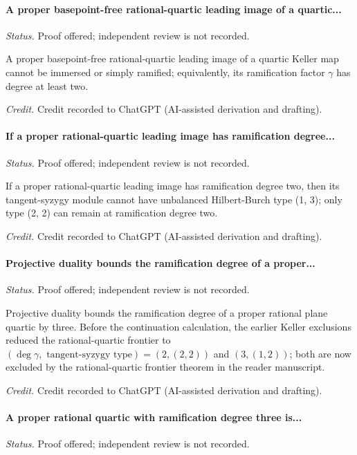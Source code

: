 \label{supp-note-02-023}
\paragraph{A proper basepoint-free rational-quartic leading image of a quartic...}
\emph{Status.} Proof offered; independent review is not recorded.

A proper basepoint-free rational-quartic leading image of a quartic Keller
map cannot be immersed or simply ramified; equivalently, its ramification
factor \(\gamma\) has degree at least two.

\emph{Credit.} Credit recorded to ChatGPT (AI-assisted derivation and drafting).

\label{supp-note-02-024}
\paragraph{If a proper rational-quartic leading image has ramification degree...}
\emph{Status.} Proof offered; independent review is not recorded.

If a proper rational-quartic leading image has ramification degree two, then its tangent-syzygy module cannot have unbalanced Hilbert-Burch type (1, 3); only type (2, 2) can remain at ramification degree two.

\emph{Credit.} Credit recorded to ChatGPT (AI-assisted derivation and drafting).

\label{supp-note-02-025}
\paragraph{Projective duality bounds the ramification degree of a proper...}
\emph{Status.} Proof offered; independent review is not recorded.

Projective duality bounds the ramification degree of a proper rational plane
quartic by three.  Before the continuation calculation, the earlier Keller
exclusions reduced the rational-quartic frontier to
\((\deg\gamma,\text{ tangent-syzygy type})=(2,(2,2))\) and
\((3,(1,2))\); both are now excluded by the rational-quartic frontier
theorem in the reader manuscript.

\emph{Credit.} Credit recorded to ChatGPT (AI-assisted derivation and drafting).

\label{supp-note-02-026}
\paragraph{A proper rational quartic with ramification degree three is...}
\emph{Status.} Proof offered; independent review is not recorded.

